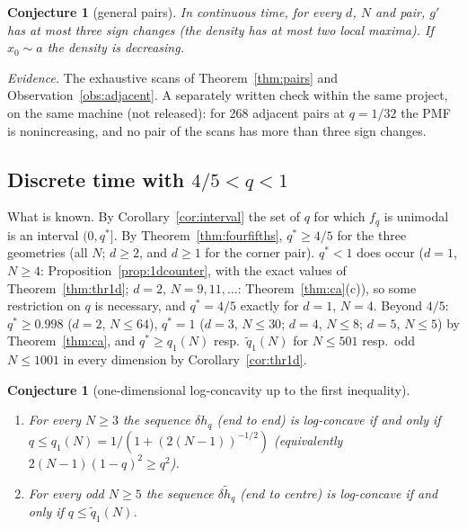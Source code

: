 \documentclass[11pt,a4paper]{article}
\newtheorem{conjecture}[theorem]{Conjecture}
\theoremstyle{definition}
\begin{document}
\begin{conjecture}[general pairs]\label{conj:general}
In continuous time, for every $d$, $N$ and pair, $g'$ has at most three sign changes (the density has at most two local maxima). If $x_0\sim a$ the density is decreasing.
\end{conjecture}
\emph{Evidence.} The exhaustive scans of Theorem~\ref{thm:pairs} and Observation~\ref{obs:adjacent}. A separately written check within the same project, on the same machine (not released): for 268 adjacent pairs at $q=1/32$ the PMF is nonincreasing, and no pair of the scans has more than three sign changes.

\subsection{Discrete time with $4/5<q<1$}\label{sec:opendisc}

What is known. By Corollary~\ref{cor:interval} the set of $q$ for which $f_q$ is unimodal is an interval $(0,q^*]$. By Theorem~\ref{thm:fourfifths}, $q^*\ge4/5$ for the three geometries (all $N$; $d\ge2$, and $d\ge1$ for the corner pair). $q^*<1$ does occur ($d=1$, $N\ge4$: Proposition~\ref{prop:1dcounter}, with the exact values of Theorem~\ref{thm:thr1d}; $d=2$, $N=9,11,\dots$: Theorem~\ref{thm:ca}(c)), so some restriction on $q$ is necessary, and $q^*=4/5$ exactly for $d=1$, $N=4$. Beyond $4/5$: $q^*\ge0.998$ ($d=2$, $N\le64$), $q^*=1$ ($d=3$, $N\le30$; $d=4$, $N\le8$; $d=5$, $N\le5$) by Theorem~\ref{thm:ca}, and $q^*\ge q_1(N)$ resp.\ $\tilde q_1(N)$ for $N\le501$ resp.\ odd $N\le1001$ in every dimension by Corollary~\ref{cor:thr1d}.

\begin{conjecture}[one-dimensional log-concavity up to the first inequality]\label{conj:1dlc}
\begin{enumerate}
\item[(a)] For every $N\ge3$ the sequence $\delta h_q$ (end to end) is log-concave if and only if $q\le q_1(N)=1/(1+(2(N-1))^{-1/2})$ (equivalently $2(N-1)(1-q)^2\ge q^2$).
\item[(b)] For every odd $N\ge5$ the sequence $\delta\tilde h_q$ (end to centre) is log-concave if and only if $q\le\tilde q_1(N)$.
\end{enumerate}
\end{conjecture}
\end{document}
